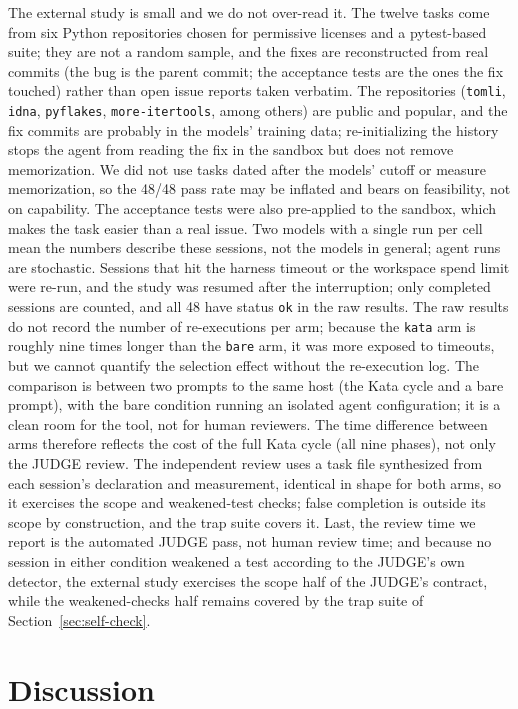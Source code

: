 \documentclass{sbc2019}%
\begin{document}
The external study is small and we do not over-read it. The twelve tasks
come from six Python repositories chosen for permissive licenses and a
pytest-based suite; they are not a random sample, and the fixes are
reconstructed from real commits (the bug is the parent commit; the
acceptance tests are the ones the fix touched) rather than open issue
reports taken verbatim. The repositories (\texttt{tomli}, \texttt{idna}, \texttt{pyflakes}, \texttt{more-itertools}, among others) are public and popular, and the fix commits are probably in the models' training data; re-initializing the history stops the agent from reading the fix in the sandbox but does not remove memorization. We did not use tasks dated after the models' cutoff or measure memorization, so the 48/48 pass rate may be inflated and bears on feasibility, not on capability. The acceptance tests were also pre-applied to the sandbox, which makes the task easier than a real issue. Two models with a single run per cell mean the
numbers describe these sessions, not the models in general; agent runs are
stochastic. Sessions that hit the harness timeout or the workspace spend
limit were re-run, and the study was resumed after the interruption;
only completed sessions are counted, and all 48 have status \texttt{ok} in
the raw results. The raw results do not record the number of re-executions
per arm; because the \texttt{kata} arm is roughly nine times longer than
the \texttt{bare} arm, it was more exposed to timeouts, but we cannot
quantify the selection effect without the re-execution log. The comparison is between two prompts to the
same host (the
Kata cycle and a bare prompt), with the bare condition running an isolated
agent configuration; it is a clean room for the tool, not for human
reviewers. The time difference between arms therefore reflects the cost
of the full Kata cycle (all nine phases), not only the JUDGE review. The independent review uses a task file synthesized from each
session's declaration and measurement, identical in shape for both arms,
so it exercises the scope and weakened-test checks; false completion is
outside its scope by construction, and the trap suite covers it. Last,
the review time we report is the automated JUDGE pass,
not human review time; and because no session in either condition weakened
a test according to the JUDGE's own detector, the external study exercises the
scope half of the JUDGE's
contract, while the weakened-checks half remains covered by the trap suite
of Section~\ref{sec:self-check}.

\section{Discussion}
\label{sec:discussion}
\end{document}
